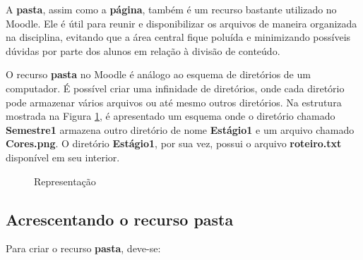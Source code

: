 A \textbf{pasta}, assim como a \textbf{página}, também é um recurso bastante utilizado no Moodle. Ele é útil para reunir e disponibilizar os arquivos de maneira organizada na disciplina, evitando que a área central fique poluída e minimizando possíveis dúvidas por parte dos alunos em relação à divisão de conteúdo.

O recurso \textbf{pasta} no Moodle é análogo ao esquema de diretórios de um computador. É possível criar uma infinidade de diretórios, onde cada diretório pode armazenar vários arquivos ou até mesmo outros diretórios. Na estrutura mostrada na Figura \ref{fig:cap4_17}, é apresentado um esquema onde o diretório chamado \textbf{Semestre1} armazena outro diretório de nome \textbf{Estágio1} e um arquivo chamado \textbf{Cores.png}. O diretório\textbf{ Estágio1}, por sua vez, possui o arquivo \textbf{roteiro.txt} disponível em seu interior.

\begin{figure}[htbp]
 \begin{center}
  \caption{Representação}
  \label{fig:cap4_17}
 \end{center}
\end{figure}

\subsection{Acrescentando o recurso pasta}
Para criar o recurso \textbf{pasta}, deve-se:

